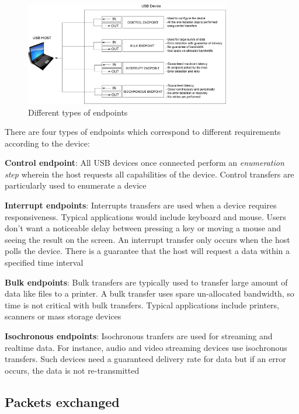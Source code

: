 \documentclass[pdftex,10pt,a4paper]{report}
\newenvironment{packed_item}{
\begin{itemize}
  \setlength{\itemsep}{1pt}
  \setlength{\parskip}{0pt}
  \setlength{\parsep}{0pt}
}{\end{itemize}}
\begin{document}
\begin{figure}[h!]
		\centering
		\includegraphics[width=0.8\textwidth]{./endpoints.jpg}
		\caption{Different types of endpoints}
		\label{Different types of endpoints}
\end{figure}

There are four types of endpoints which correspond to different requirements according to the device: 
\begin{packed_item}
	\item \textbf{Control endpoint}: All USB devices once connected perform an \textit{enumeration step} wherein the host requests all capabilities of the device. Control transfers are particularly used to enumerate a device
	\item \textbf{Interrupt endpoints}: Interrupts transfers are used when a device requires responsiveness. Typical applications would include keyboard and mouse. Users don't want a noticeable delay between pressing a key or moving a mouse and seeing the result on the screen. An interrupt transfer only occurs when the host polls the device. There is a guarantee that the host will request a data within a specified time interval
	\item \textbf{Bulk endpoints}: Bulk transfers are typically used to transfer large amount of data like files to a printer. A bulk transfer uses spare un-allocated bandwidth, so time is not critical with bulk transfers. Typical applications include printers, scanners or mass storage devices
	\item \textbf{Isochronous endpoints}: Isochronous tranfers are used for streaming and realtime data. For instance, audio and video streaming devices use isochronous transfers. Such devices need a guaranteed delivery rate for data but if an error occurs, the data is not re-transmitted
\end{packed_item}
	

\subsection{Packets exchanged}
\end{document}

